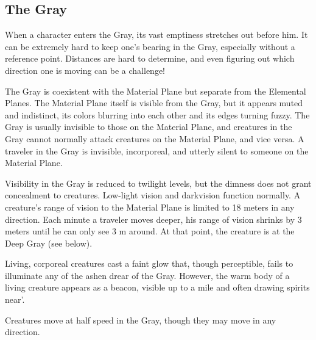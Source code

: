 \subsection{The Gray}
When a character enters the Gray, its vast emptiness stretches out before him. It can be extremely hard to keep one's bearing in the Gray, especially without a reference point. Distances are hard to determine, and even figuring out which direction one is moving can be a challenge!

The Gray is coexistent with the Material Plane but separate from the Elemental Planes. The Material Plane itself is visible from the Gray, but it appears muted and indistinct, its colors blurring into each other and its edges turning fuzzy. The Gray is usually invisible to those on the Material Plane, and creatures in the Gray cannot normally attack creatures on the Material Plane, and vice versa. A traveler in the Gray is invisible, incorporeal, and utterly silent to someone on the Material Plane.

Visibility in the Gray is reduced to twilight levels, but the dimness does not grant concealment to creatures. Low-light vision and darkvision function normally. A creature's range of vision to the Material Plane is limited to 18 meters in any direction. Each minute a traveler moves deeper, his range of vision shrinks by 3 meters until he can only see 3 m around. At that point, the creature is at the Deep Gray (see below).

Living, corporeal creatures cast a faint glow that, though perceptible, fails to illuminate any of the ashen drear of the Gray. However, the warm body of a living creature appears as a beacon, visible up to a mile and often drawing spirits near'.

Creatures move at half speed in the Gray, though they may move in any direction.


